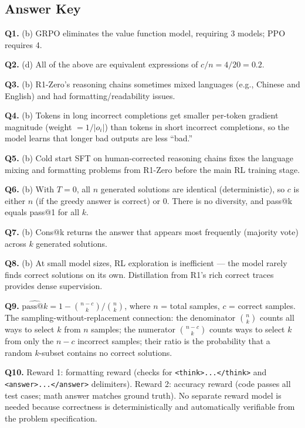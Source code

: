 \documentclass[11pt, a4paper]{article}
\begin{document}
\newpage
\subsection*{Answer Key}

\textbf{Q1.} (b) GRPO eliminates the value function model, requiring 3 models; PPO requires 4.

\textbf{Q2.} (d) All of the above are equivalent expressions of $c/n = 4/20 = 0.2$.

\textbf{Q3.} (b) R1-Zero's reasoning chains sometimes mixed languages (e.g., Chinese and English) and had formatting/readability issues.

\textbf{Q4.} (b) Tokens in long incorrect completions get smaller per-token gradient magnitude (weight $= 1/|o_i|$) than tokens in short incorrect completions, so the model learns that longer bad outputs are less ``bad.''

\textbf{Q5.} (b) Cold start SFT on human-corrected reasoning chains fixes the language mixing and formatting problems from R1-Zero before the main RL training stage.

\textbf{Q6.} (b) With $T=0$, all $n$ generated solutions are identical (deterministic), so $c$ is either $n$ (if the greedy answer is correct) or 0. There is no diversity, and pass@k equals pass@1 for all $k$.

\textbf{Q7.} (b) Cons@k returns the answer that appears most frequently (majority vote) across $k$ generated solutions.

\textbf{Q8.} (b) At small model sizes, RL exploration is inefficient --- the model rarely finds correct solutions on its own. Distillation from R1's rich correct traces provides dense supervision.

\textbf{Q9.} $\widehat{\text{pass@}k} = 1 - \binom{n-c}{k}/\binom{n}{k}$, where $n$ = total samples, $c$ = correct samples. The sampling-without-replacement connection: the denominator $\binom{n}{k}$ counts all ways to select $k$ from $n$ samples; the numerator $\binom{n-c}{k}$ counts ways to select $k$ from only the $n-c$ incorrect samples; their ratio is the probability that a random $k$-subset contains no correct solutions.

\textbf{Q10.} Reward 1: formatting reward (checks for \texttt{<think>...</think>} and \texttt{<answer>...</answer>} delimiters). Reward 2: accuracy reward (code passes all test cases; math answer matches ground truth). No separate reward model is needed because correctness is deterministically and automatically verifiable from the problem specification.
\end{document}
